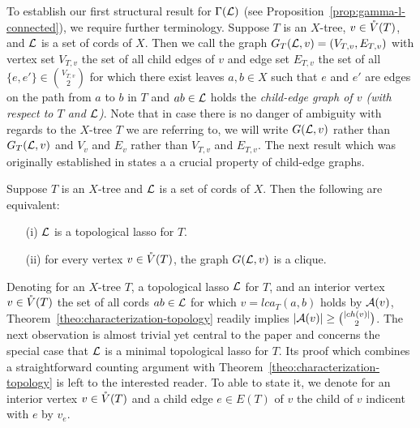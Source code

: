 To establish our first structural result 
for $\Gamma({\mathcal L})$ (see 
Proposition~\ref{prop:gamma-l-connected}), 
we require further terminology. 
Suppose $T$ is an $X$-tree, $v\in \mathring{V}(T)$, and 
${\mathcal L}$ is a 
set of cords of $X$. Then we call
the graph $G_T({\mathcal L},v)=(V_{T,v},E_{T,v})$ with vertex set $V_{T,v}$
the set of all child edges of $v$ and edge set $E_{T,v}$ the
set of all $\{e,e'\}\in {V_{T,v}\choose 2}$ for which there
exist leaves $a,b\in X$ such that
$e$ and $e'$ are edges on the path from $a$ to $b$ in $T$ 
and $ab\in {\mathcal L}$ holds the {\em child-edge graph of $v$ (with respect 
to $T$ and ${\mathcal L}$)}. Note that in case there is no danger of 
ambiguity with regards to the $X$-tree $T$ we are referring to, we
 will write $G({\mathcal L},v)$ rather than $G_T({\mathcal L},v)$ and $V_v$ and $E_v$
rather than $V_{T,v}$ and $E_{T,v}$. The next result which was originally
established in \cite[Theorem 7.1]{HP13}
states a a crucial property of child-edge graphs.

\begin{thm}\label{theo:characterization-topology}
Suppose $T$ is an $X$-tree and 
${\mathcal L}$ is a set of cords of $X$. 
Then the following are equivalent:
\begin{enumerate}
\item[(i)] ${\mathcal L}$ is a topological lasso for $T$.
\item[(ii)] for every vertex $v\in \mathring{V}(T)$, the graph
$G({\mathcal L},v)$ is a clique.
\end{enumerate}
\end{thm}



Denoting for an $X$-tree $T$, a topological lasso ${\mathcal L}$ for
$T$, and an interior vertex $v\in \mathring{V}(T)$ 
the set of all cords $ab\in {\mathcal L}$ for which
$v=lca_T(a,b)$ holds  by 
${\mathcal A}(v)$, Theorem~\ref{theo:characterization-topology}
readily implies $|{\mathcal A}(v)|\geq {|ch(v)|\choose 2}$.
The next observation is almost trivial yet central to the paper and  
concerns the special case 
that ${\mathcal L}$ is a minimal topological lasso for $T$. Its
proof which combines a straightforward counting argument 
with Theorem~\ref{theo:characterization-topology} is left to
the interested reader. To able to state it,
we denote for an interior vertex $v\in \mathring{V}(T)$ and a child edge $e\in E(T)$
of $v$  the child of $v$ indicent with $e$ by $v_e$.  

